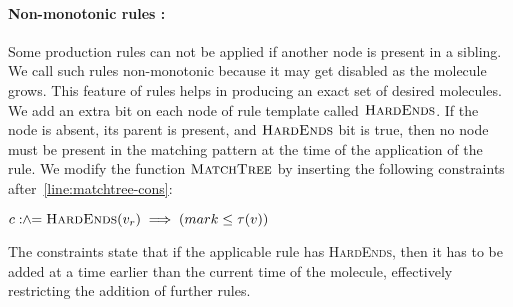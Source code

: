 \paragraph{Non-monotonic rules :}
Some production rules can not be applied if another node is present in a sibling.
We call such rules non-monotonic because it may get disabled as the molecule grows.
This feature of rules helps in producing an exact set of desired molecules.
We add an extra bit on each node of rule
template called $\textsc{HardEnds}$.
If the node is absent, its parent is present, and  $\textsc{HardEnds}$ bit is true, then
no node must be present in the matching pattern at the time of the application of the rule.
We modify the function $\textsc{MatchTree}$ by inserting the following constraints after~\ref{line:matchtree-cons}:
\begin{minipage}{1.0\linewidth}
\begin{algorithmic}[1]
  \State $c \mathrel{:\hspace{-3pt}\land\hspace{-3pt}=} \textsc{HardEnds}(v_r) \implies (mark \leq \tau(v))$
\end{algorithmic}  
\end{minipage}
The constraints state that if the applicable rule has \textsc{HardEnds}, then it has to be added at a time earlier than the current time of the molecule, effectively restricting the addition of further rules.



